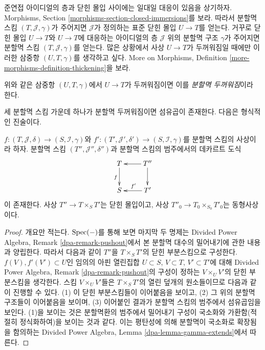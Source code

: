 \noindent
준연접 아이디얼의 층과 닫힌 몰입 사이에는 일대일 대응이 있음을
상기하자. Morphisms, Section \ref{morphisms-section-closed-immersions}를
보라. 따라서 분할멱 스킴 $(T, \mathcal{J}, \gamma)$가 주어지면
$\mathcal{J}$가 정의하는 표준 닫힌 몰입 $U \to T$를 얻는다.
거꾸로 닫힌 몰입 $U \to T$와 $U \to T$에 대응하는 아이디얼의 층
$\mathcal{J}$ 위의 분할멱 구조 $\gamma$가 주어지면 분할멱 스킴
$(T, \mathcal{J}, \gamma)$를 얻는다. 많은 상황에서 사상 $U \to T$가
두꺼워짐일 때에만 이러한 삼중항 $(U, T, \gamma)$를 생각하고 싶다.
More on Morphisms, Definition \ref{more-morphisms-definition-thickening}을 보라.

\begin{definition}
\label{definition-divided-power-thickening}
위와 같은 삼중항 $(U, T, \gamma)$에서 $U \to T$가 두꺼워짐이면
이를 {\it 분할멱 두꺼워짐}이라 한다.
\end{definition}

\noindent
세 분할멱 스킴 가운데 하나가 분할멱 두꺼워짐이면 섬유곱이
존재한다. 다음은 형식적인 진술이다.

\begin{lemma}
\label{lemma-fibre-product}
$f : (T, \mathcal{J}, \delta) \to (S, \mathcal{I}, \gamma)$와
$f' : (T', \mathcal{J}', \delta') \to (S, \mathcal{I}, \gamma)$를
분할멱 스킴의 사상이라 하자. 분할멱 스킴
$(T'', \mathcal{J}'', \delta'')$과 분할멱 스킴의 범주에서의
데카르트 도식
$$
\xymatrix{
T \ar[d]_f & T'' \ar[d] \ar[l] \\
S & T' \ar[l]_{f'}
}
$$
이 존재한다. 사상 $T'' \to T \times_S T'$는 닫힌 몰입이고,
사상 $T''_0 \to T_0 \times_{S_0} T'_0$는 동형사상이다.
\end{lemma}

\begin{proof}
개요만 적는다. $\mathop{\mathrm{Spec}}(-)$를 통해 보면 마지막 두 명제는
Divided Power Algebra, Remark \ref{dpa-remark-pushout}에서 본
분할멱 대수의 밀어내기에 관한 내용과 양립한다.
따라서 다음과 같이 $T''$을 $T \times_S T'$의 닫힌 부분스킴으로
구성한다. $f(V), f'(V') \subset U$인 임의의 아핀 열린집합
$U \subset S$, $V \subset T$, $V' \subset T'$에 대해
Divided Power Algebra, Remark \ref{dpa-remark-pushout}의 구성이 정하는
$V \times_U V'$의 닫힌 부분스킴을 생각한다. 스킴
$V \times_U V'$들은 $T \times_S T'$의 열린 덮개의 원소들이므로
다음과 같이 진행할 수 있다. (1) 이 닫힌 부분스킴들이 이어붙음을 보이고,
(2) 그 위의 분할멱 구조들이 이어붙음을 보이며, (3) 이어붙인 결과가
분할멱 스킴의 범주에서 섬유곱임을 보인다. (1)을 보이는 것은
분할멱환의 범주에서 밀어내기 구성이 국소화와 가환함(적절히
정식화하여)을 보이는 것과 같다. 이는 평탄성에 의해 분할멱이
국소화로 확장됨을 함의하는 Divided Power Algebra,
Lemma \ref{dpa-lemma-gamma-extends}에서 따른다.
\end{proof}

